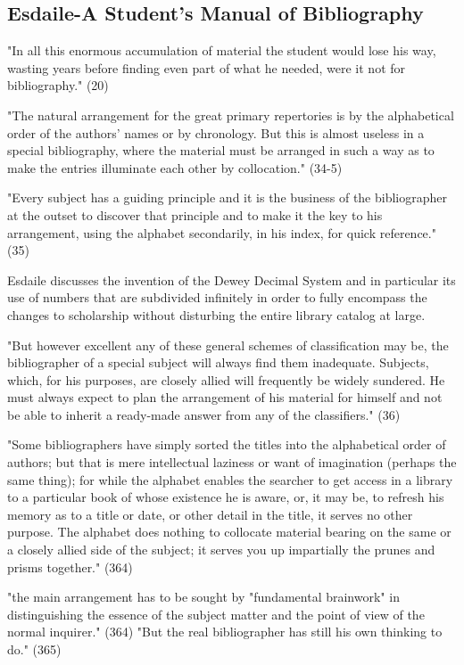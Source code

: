 \documentclass[course, english]{Notes}
\newcommand{\n}{\scalebox{2}{\textbf{\framebox{$\aleph$} } } }
\begin{document}
\subsection{Esdaile-A Student's Manual of Bibliography}
\begin{outline}
\1 "In all this enormous accumulation of material the student would lose his way, wasting years before finding even part of what he needed, were it not for bibliography." (20)

\1 "The natural arrangement for the great primary repertories is by the alphabetical order of the authors' names or by chronology. But this is almost useless in a special bibliography, where the material must be arranged in such a way as to make the entries illuminate each other by collocation." (34-5)

\1 "Every subject has a guiding principle and it is the business of the bibliographer at the outset to discover that principle and to make it the key to his arrangement, using the alphabet secondarily, in his index, for quick reference." (35)

\1 \n Esdaile discusses the invention of the Dewey Decimal System and in particular its use of numbers that are subdivided infinitely in order to fully encompass the changes to scholarship without disturbing the entire library catalog at large. 

\1 "But however excellent any of these general schemes of classification may be, the bibliographer of a special subject will always find them inadequate. Subjects, which, for his purposes, are closely allied will frequently be widely sundered. He must always expect to plan the arrangement of his material for himself and not be able to inherit a ready-made answer from any of the classifiers." (36)

\1 "Some bibliographers have simply sorted the titles into the alphabetical order of authors; but that is mere intellectual laziness or want of imagination (perhaps the same thing); for while the alphabet enables the searcher to get access in a library to a particular book of whose existence he is aware, or, it may be, to refresh his memory as to a title or date, or other detail in the title, it serves no other purpose. The alphabet does nothing to collocate material bearing on the same or a closely allied side of the subject; it serves you up impartially the prunes and prisms together." (364) 

\1 "the main arrangement has to be sought by "fundamental brainwork" in distinguishing the essence of the subject matter and the point of view of the normal inquirer." (364)
	\2 "But the real bibliographer has still his own thinking to do." (365)
	

\end{outline}
\end{document}
